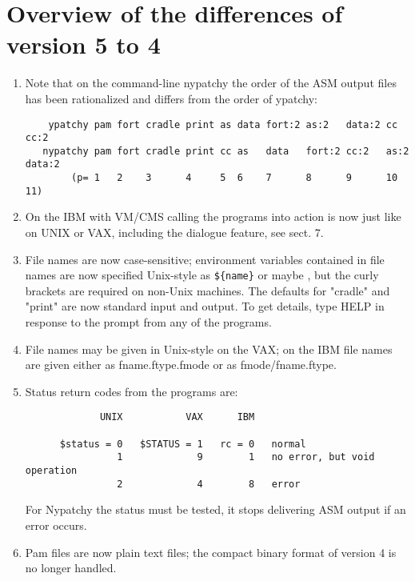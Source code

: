 \section{Overview of the differences of version 5 to 4}
\label{sec:overview}

\renewcommand{\labelenumi}{\ref{sec:overview}.\theenumi)\ }

\begin{enumerate}
\item
Note that on the command-line nypatchy the order of the ASM output
files has been rationalized and differs from the order of ypatchy:
\begin{verbatim}
    ypatchy pam fort cradle print as data fort:2 as:2   data:2 cc   cc:2
   nypatchy pam fort cradle print cc as   data   fort:2 cc:2   as:2 data:2
        (p= 1   2    3      4     5  6    7      8      9      10   11)
\end{verbatim}
\item
On the IBM with VM/CMS calling the programs into action is now
just like on UNIX or VAX, including the dialogue feature, see sect. 7.

\item
File names are now case-sensitive; environment variables contained
in file names are now specified Unix-style as \verb!${name}! or maybe ,
but the curly brackets are required on non-Unix machines. The defaults
for "cradle" and "print" are now standard input and output. To get
details, type HELP in response to the prompt from any of the programs.

\item
File names may be given in Unix-style on the VAX; on the IBM file
names are given either as fname.ftype.fmode or as fmode/fname.ftype.

\item
Status return codes from the programs are:
\begin{verbatim}
             UNIX           VAX      IBM

      $status = 0   $STATUS = 1   rc = 0   normal
                1             9        1   no error, but void operation
                2             4        8   error
\end{verbatim}
For Nypatchy the status must be tested, it stops delivering ASM output
if an error occurs.

\item
Pam files are now plain text files; the compact binary format of
version 4 is no longer handled.


\end{enumerate}
